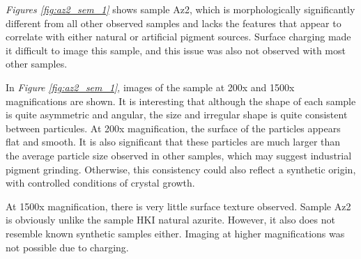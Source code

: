\textit{Figures \ref{fig:az2_sem_1}} shows sample Az2, which is morphologically significantly different from all other observed samples and lacks the features that appear to correlate with either natural or artificial pigment sources. Surface charging made it difficult to image this sample, and this issue was also not observed with most other samples.

In \textit{Figure \ref{fig:az2_sem_1}}, images of the sample at 200x and 1500x magnifications are shown. It is interesting that although the shape of each sample is quite asymmetric and angular, the size and irregular shape is quite consistent between particules. At 200x magnification, the surface of the particles appears flat and smooth. It is also significant that these particles are much larger than the average particle size observed in other samples, which may suggest industrial pigment grinding. Otherwise, this consistency could also reflect a synthetic origin, with controlled conditions of crystal growth.

At 1500x magnification, there is very little surface texture observed. Sample Az2 is obviously unlike the sample HKI natural azurite. However, it also does not resemble known synthetic samples either. Imaging at higher magnifications was not possible due to charging.

